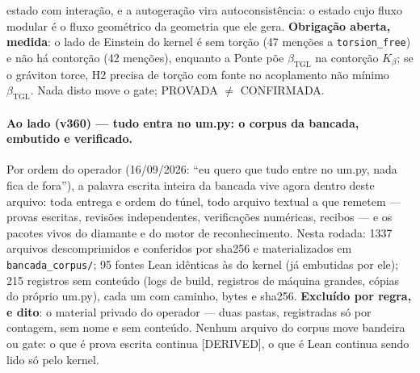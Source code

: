\documentclass[11pt]{article}
\newcommand{\bTGL}{\beta_{\mathrm{TGL}}}\newcommand{\Msun}{M_{\odot}}\newcommand{\TGL}{\mathrm{TGL}}
\theoremstyle{definition}\newtheorem{deriv}{Derivação}
\begin{document}
estado com interação, e a autogeração vira autoconsistência: o estado cujo fluxo modular é o fluxo geométrico da geometria que ele gera. \textbf{Obrigação aberta, medida}: o lado de Einstein do kernel é sem torção (47 menções a \texttt{torsion\_free}) e não há contorção (42 menções), enquanto a Ponte põe $\bTGL$ na contorção $K_\beta$; se o gráviton torce, H2 precisa de torção com fonte no acoplamento não mínimo $\bTGL$. Nada disto move o gate; PROVADA $\neq$ CONFIRMADA.

\paragraph*{Ao lado (v360) --- tudo entra no um.py: o corpus da bancada, embutido e verificado.} Por ordem do operador (16/09/2026: ``eu quero que tudo entre no um.py, nada fica de fora''), a palavra escrita inteira da bancada vive agora dentro deste arquivo: toda entrega e ordem do túnel, todo arquivo textual a que remetem --- provas escritas, revisões independentes, verificações numéricas, recibos --- e os pacotes vivos do diamante e do motor de reconhecimento. Nesta rodada: 1337 arquivos descomprimidos e conferidos por sha256 e materializados em \texttt{bancada\_corpus/}; 95 fontes Lean idênticas às do kernel (já embutidas por ele); 215 registros sem conteúdo (logs de build, registros de máquina grandes, cópias do próprio um.py), cada um com caminho, bytes e sha256. \textbf{Excluído por regra, e dito}: o material privado do operador --- duas pastas, registradas só por contagem, sem nome e sem conteúdo. Nenhum arquivo do corpus move bandeira ou gate: o que é prova escrita continua [DERIVED], o que é Lean continua sendo lido só pelo kernel.
\end{document}
